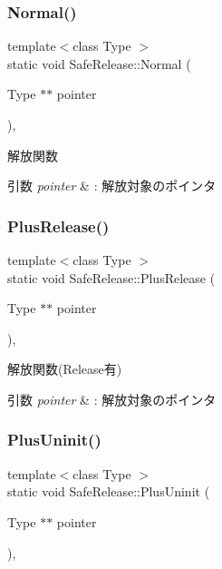 \subsubsection{\texorpdfstring{Normal()}{Normal()}}
{\footnotesize\ttfamily template$<$class Type $>$ \\
static void Safe\+Release\+::\+Normal (\begin{DoxyParamCaption}\item[{Type $\ast$$\ast$}]{pointer }\end{DoxyParamCaption})\hspace{0.3cm}{\ttfamily [inline]}, {\ttfamily [static]}}



解放関数 


\begin{DoxyParams}{引数}
{\em pointer} & \+: 解放対象のポインタ \\
\hline
\end{DoxyParams}
\mbox{\label{class_safe_release_a507950335a85da67c1722cce83dca9ae}} 
\subsubsection{\texorpdfstring{Plus\+Release()}{PlusRelease()}}
{\footnotesize\ttfamily template$<$class Type $>$ \\
static void Safe\+Release\+::\+Plus\+Release (\begin{DoxyParamCaption}\item[{Type $\ast$$\ast$}]{pointer }\end{DoxyParamCaption})\hspace{0.3cm}{\ttfamily [inline]}, {\ttfamily [static]}}



解放関数(Release有) 


\begin{DoxyParams}{引数}
{\em pointer} & \+: 解放対象のポインタ \\
\hline
\end{DoxyParams}
\mbox{\label{class_safe_release_a06160f5466a88f021e6f28489de9df1e}} 
\subsubsection{\texorpdfstring{Plus\+Uninit()}{PlusUninit()}}
{\footnotesize\ttfamily template$<$class Type $>$ \\
static void Safe\+Release\+::\+Plus\+Uninit (\begin{DoxyParamCaption}\item[{Type $\ast$$\ast$}]{pointer }\end{DoxyParamCaption})\hspace{0.3cm}{\ttfamily [inline]}, {\ttfamily [static]}}



